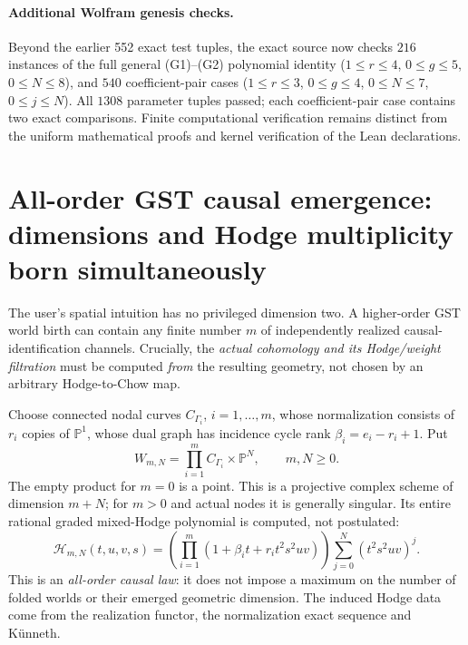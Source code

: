 \documentclass[11pt]{article}
\begin{document}
\paragraph{Additional Wolfram genesis checks.}
Beyond the earlier 552 exact test tuples, the exact
source now checks $216$ instances of the full general
(G1)--(G2) polynomial identity ($1\le r\le4$, $0\le g\le5$,
$0\le N\le8$), and $540$ coefficient-pair cases
($1\le r\le3$, $0\le g\le4$, $0\le N\le7$, $0\le j\le N$).
All $1308$ parameter tuples passed; each coefficient-pair
case contains two exact comparisons. Finite computational
verification remains distinct from the uniform mathematical
proofs and kernel verification of the Lean declarations.


\section{All-order GST causal emergence: dimensions and Hodge multiplicity born simultaneously}

The user's spatial intuition has no privileged dimension two. A higher-order
GST world birth can contain any finite number $m$ of independently
realized causal-identification channels. Crucially, the \emph{actual
cohomology and its Hodge/weight filtration} must be computed \emph{from}
the resulting geometry, not chosen by an arbitrary Hodge-to-Chow map.

Choose connected nodal curves $C_{\Gamma_i}$, $i=1,\ldots,m$,
whose normalization consists of $r_i$ copies of $\mathbb P^1$,
whose dual graph has incidence cycle rank
$\beta_i=e_i-r_i+1$. Put
\[
 W_{m,N}=\prod_{i=1}^{m} C_{\Gamma_i}\times\mathbb P^N,
 \qquad m,N\geq0.
\]
The empty product for $m=0$ is a point. This is a projective
complex scheme of dimension $m+N$; for $m>0$ and actual nodes it
is generally singular. Its entire rational graded mixed-Hodge
polynomial is computed, not postulated:
\[
\boxed{\quad
 \mathcal H_{m,N}(t,u,v,s)=
   \left(\prod_{i=1}^{m}(1+\beta_i t+r_i t^2s^2uv)\right)
   \sum_{j=0}^{N}(t^2s^2uv)^j.
\quad} \tag{5}
\]
This is an \emph{all-order causal law}: it does not impose a
maximum on the number of folded worlds or their emerged geometric
dimension. The induced Hodge data come from the realization functor,
the normalization exact sequence and K\"unneth.
\end{document}

